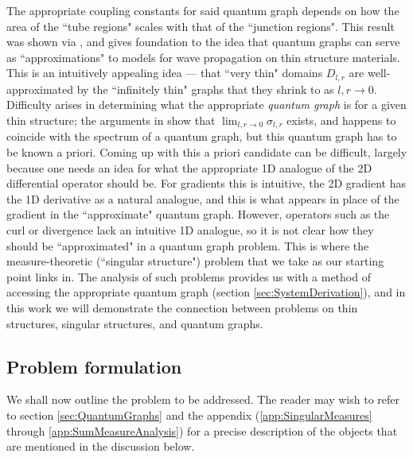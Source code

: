 The appropriate coupling constants for said quantum graph depends on how the area of the ``tube regions" scales with that of the ``junction regions".
This result was shown via , and gives foundation to the idea that quantum graphs can serve as ``approximations" to models for wave propagation on thin structure materials.
This is an intuitively appealing idea --- that ``very thin" domains $D_{l,r}$ are well-approximated by the ``infinitely thin" graphs that they shrink to as $l,r\rightarrow0$.
Difficulty arises in determining what the appropriate \emph{quantum graph} is for a given thin structure; the arguments in \cite{exner2005convergence, kuchment2001convergence} show that $\lim_{l,r\rightarrow0}\sigma_{l,r}$ exists, and happens to coincide with the spectrum of a quantum graph, but this quantum graph has to be known a priori.
Coming up with this a priori candidate can be difficult, largely because one needs an idea for what the appropriate 1D analogue of the 2D differential operator should be.
For gradients this is intuitive, the 2D gradient has the 1D derivative as a natural analogue, and this is what appears in place of the gradient in the ``approximate" quantum graph.
However, operators such as the curl or divergence lack an intuitive 1D analogue, so it is not clear how they should be ``approximated" in a quantum graph problem.
This is where the measure-theoretic (``singular structure") problem that we take as our starting point links in.
The analysis of such problems provides us with a method of accessing the appropriate quantum graph (section \ref{sec:SystemDerivation}), and in this work we will demonstrate the connection between problems on thin structures, singular structures, and quantum graphs.


\subsection{Problem formulation} \label{ssec:OurSystem}
We shall now outline the problem to be addressed.
The reader may wish to refer to section \ref{sec:QuantumGraphs} and the appendix (\ref{app:SingularMeasures} through \ref{app:SumMeasureAnalysis}) for a precise description of the objects that are mentioned in the discussion below. 

